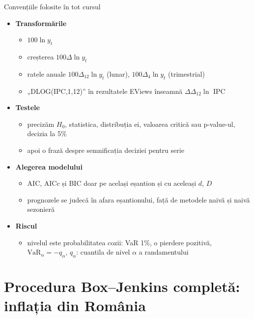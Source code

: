 \begin{frame}{Convențiile folosite în tot cursul}
\itemsize{\small}
\begin{itemize}
    \item \textbf{Transformările}
    \begin{itemize}
        \item $100\ln y_t$
        \item creșterea $100\Delta\ln y_t$
        \item ratele anuale $100\Delta_{12}\ln y_t$ (lunar), $100\Delta_4\ln y_t$ (trimestrial)
        \item „DLOG(IPC,1,12)” în rezultatele EViews înseamnă $\Delta\Delta_{12}\ln$ IPC
    \end{itemize}
    \item \textbf{Testele}
    \begin{itemize}
        \item precizăm $H_0$, statistica, distribuția ei, valoarea critică sau p-value-ul, decizia la 5\%
        \item apoi o frază despre semnificația deciziei pentru serie
    \end{itemize}
    \item \textbf{Alegerea modelului}
    \begin{itemize}
        \item AIC, AICc și BIC doar pe același eșantion și cu aceleași $d$, $D$
        \item prognozele se judecă în afara eșantionului, față de metodele naivă și naivă sezonieră
    \end{itemize}
    \item \textbf{Riscul}
    \begin{itemize}
        \item nivelul este probabilitatea cozii: VaR 1\%, o pierdere pozitivă, $\mathrm{VaR}_\alpha = -q_\alpha$, $q_\alpha$: cuantila de nivel $\alpha$ a randamentului
    \end{itemize}
\end{itemize}
\end{frame}


\section{Procedura Box--Jenkins completă: inflația din România}

